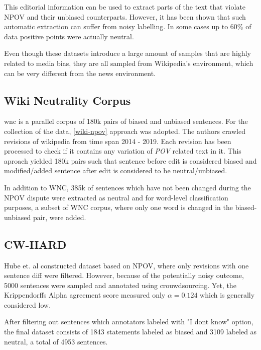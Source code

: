 This editorial information can be used to extract parts of the text that violate NPOV and their unbiased counterparts. However, it has been shown \cite{hube2019neural,zhong-etal-2021-wikibias-detecting} that such automatic extraction can suffer from noisy labelling. In some cases \cite{hube2019neural} up to 60\% of data positive points were actually neutral.

Even though these datasets introduce a large amount of samples that are highly related to media bias, they are all sampled from Wikipedia's environment, which can be very different from the news environment. 




\subsection{Wiki Neutrality Corpus}\label{wiki}
\Gls{wnc} \cite{pryzant2020automatically} is a parallel corpus of 180k pairs of biased and unbiased sentences. For the collection of the data, \ref{wiki-npov} approach was adopted. The authors crawled revisions of wikipedia from time span 2014 - 2019. Each revision has been processed to check if it contains any variation of \textit{POV} related text in it. This aproach yielded 180k pairs such that sentence before edit is considered biased and modified/added sentence after edit is considered to be neutral/unbiased.
    
In addition to WNC, 385k of sentences which have not been changed during the NPOV dispute were extracted as neutral and for word-level classification purposes, a subset of WNC corpus, where only one word is changed in the biased-unbiased pair, were added.




\subsection{CW-HARD}
Hube et. al \cite{hube2019neural} constructed dataset based on NPOV, where only revisions with one sentence diff were filtered. However, because of the potentially noisy outcome, 5000 sentences were sampled and annotated using crouwdsourcing. Yet, the Krippendorffs Alpha agreement score measured only $\alpha = 0.124$ which is generally considered low. 

After filtering out sentences which annotators labeled with "I dont know" option, the final dataset consists of 1843 statements labeled as biased and 3109 labeled as neutral, a total of 4953 sentences.

